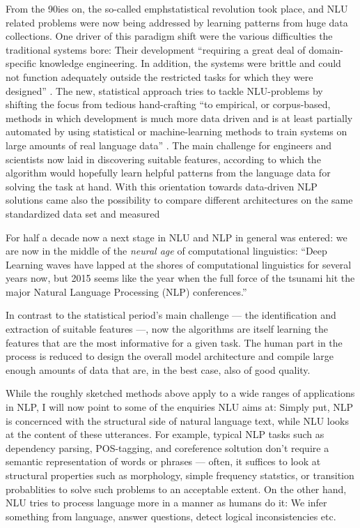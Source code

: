 From the 90ies on, the so-called emph{statistical revolution} took place, and NLU related
problems were now being addressed by learning patterns from huge data collections. One driver
of this paradigm shift were the various difficulties the traditional systems bore: Their
development ``requiring a great deal of domain-specific knowledge engineering. In addition,
the systems were brittle and could not function adequately outside the restricted tasks for
which they were designed'' \citep[p.~13]{brill1997overview}. The new, statistical {\color{red}
approach} tries to tackle NLU-problems by shifting the focus from tedious hand-crafting ``to
empirical, or corpus-based, methods in which development is much more data driven and is at
least partially automated by using statistical or machine-learning methods to train systems
on large amounts of real language data'' \citep[p.~13]{brill1997overview}. The main challenge
for engineers and scientists now laid in discovering suitable features, according to which the
algorithm would hopefully learn helpful patterns from the language data for solving the task
at hand. With this orientation towards data-driven NLP solutions came also the possibility to
compare different architectures on the same standardized data set and measured

For half a decade now a next stage in NLU and NLP in general was entered: we are now in the
middle of the \emph{neural age} of computational linguistics:
{\color{red} ``Deep Learning waves have lapped at the shores of computational linguistics for several
years now, but 2015 seems like the year when the full force of the tsunami hit the
major Natural Language Processing (NLP) conferences.'' \citep[p.~701]{manning2015computational}}

In contrast to the statistical
period's main challenge --- the identification and extraction of suitable features ---, now the
algorithms are itself learning the features that are the most informative for a given task. The
human part in the process is reduced to design the overall model architecture and compile large
enough amounts of data that are, in the best case, also of good quality.

While the roughly sketched methods above apply to a wide ranges of applications in NLP, I will now
point to some of the enquiries NLU aims at: Simply put, NLP is concernced with the structural side
of natural language text, while NLU looks at the content of these utterances. For example, typical
NLP tasks such as dependency parsing, POS-tagging, and coreference soltution don't require a
semantic representation of words or phrases --- often, it suffices to look at structural properties
such as morphology, simple frequency statstics, or transition probablities to solve such problems
to an acceptable extent. On the other hand, NLU tries to process language more in a manner as
humans do it: We infer something from language, answer questions, detect logical inconsistencies
etc.

